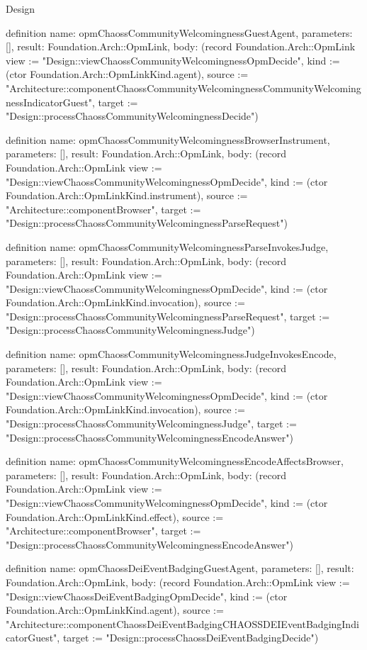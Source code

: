 \begin{lexlean}{Design}
\begin{semanticmodule}
definition{
  name: opmChaossCommunityWelcomingnessGuestAgent,
  parameters: [],
  result: Foundation.Arch::OpmLink,
  body: (record Foundation.Arch::OpmLink {view := "Design::viewChaossCommunityWelcomingnessOpmDecide", kind := (ctor Foundation.Arch::OpmLinkKind.agent), source := "Architecture::componentChaossCommunityWelcomingnessCommunityWelcomingnessIndicatorGuest", target := "Design::processChaossCommunityWelcomingnessDecide"})
}

definition{
  name: opmChaossCommunityWelcomingnessBrowserInstrument,
  parameters: [],
  result: Foundation.Arch::OpmLink,
  body: (record Foundation.Arch::OpmLink {view := "Design::viewChaossCommunityWelcomingnessOpmDecide", kind := (ctor Foundation.Arch::OpmLinkKind.instrument), source := "Architecture::componentBrowser", target := "Design::processChaossCommunityWelcomingnessParseRequest"})
}

definition{
  name: opmChaossCommunityWelcomingnessParseInvokesJudge,
  parameters: [],
  result: Foundation.Arch::OpmLink,
  body: (record Foundation.Arch::OpmLink {view := "Design::viewChaossCommunityWelcomingnessOpmDecide", kind := (ctor Foundation.Arch::OpmLinkKind.invocation), source := "Design::processChaossCommunityWelcomingnessParseRequest", target := "Design::processChaossCommunityWelcomingnessJudge"})
}

definition{
  name: opmChaossCommunityWelcomingnessJudgeInvokesEncode,
  parameters: [],
  result: Foundation.Arch::OpmLink,
  body: (record Foundation.Arch::OpmLink {view := "Design::viewChaossCommunityWelcomingnessOpmDecide", kind := (ctor Foundation.Arch::OpmLinkKind.invocation), source := "Design::processChaossCommunityWelcomingnessJudge", target := "Design::processChaossCommunityWelcomingnessEncodeAnswer"})
}

definition{
  name: opmChaossCommunityWelcomingnessEncodeAffectsBrowser,
  parameters: [],
  result: Foundation.Arch::OpmLink,
  body: (record Foundation.Arch::OpmLink {view := "Design::viewChaossCommunityWelcomingnessOpmDecide", kind := (ctor Foundation.Arch::OpmLinkKind.effect), source := "Architecture::componentBrowser", target := "Design::processChaossCommunityWelcomingnessEncodeAnswer"})
}

definition{
  name: opmChaossDeiEventBadgingGuestAgent,
  parameters: [],
  result: Foundation.Arch::OpmLink,
  body: (record Foundation.Arch::OpmLink {view := "Design::viewChaossDeiEventBadgingOpmDecide", kind := (ctor Foundation.Arch::OpmLinkKind.agent), source := "Architecture::componentChaossDeiEventBadgingCHAOSSDEIEventBadgingIndicatorGuest", target := "Design::processChaossDeiEventBadgingDecide"})
}


\end{semanticmodule}
\end{lexlean}
